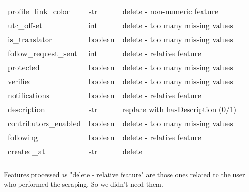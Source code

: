 \begin{center}
\begin{tabular}{lll}
		profile\_link\_color&str&delete - non-numeric feature\\
		utc\_offset&int&delete - too many missing values\\
		is\_translator&boolean&delete - too many missing values\\
		follow\_request\_sent&int&delete - relative feature\\
		protected&boolean&delete - too many missing values\\
		verified&boolean&delete - too many missing values\\
		notifications&boolean&delete - relative feature\\
		description&str&replace with hasDescription (0/1)\\
		contributors\_enabled&boolean&delete - too many missing values\\
		following&boolean&delete - relative feature\\
		created\_at&str&delete\\\hline\\
	\end{tabular}
\end{center}
\normalsize
Features processed as "delete - relative feature" are those ones related to the user who performed the scraping. So we didn't need them.

